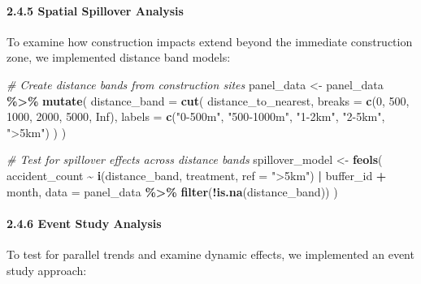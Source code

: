 \documentclass[
]{article}
\newenvironment{Shaded}{\begin{snugshade}}{\end{snugshade}}
\newcommand{\AttributeTok}[1]{\textcolor[rgb]{0.13,0.29,0.53}{#1}}
\newcommand{\CommentTok}[1]{\textcolor[rgb]{0.56,0.35,0.01}{\textit{#1}}}
\newcommand{\ConstantTok}[1]{\textcolor[rgb]{0.56,0.35,0.01}{#1}}
\newcommand{\DecValTok}[1]{\textcolor[rgb]{0.00,0.00,0.81}{#1}}
\newcommand{\FunctionTok}[1]{\textcolor[rgb]{0.13,0.29,0.53}{\textbf{#1}}}
\newcommand{\NormalTok}[1]{#1}
\newcommand{\OtherTok}[1]{\textcolor[rgb]{0.56,0.35,0.01}{#1}}
\newcommand{\SpecialCharTok}[1]{\textcolor[rgb]{0.81,0.36,0.00}{\textbf{#1}}}
\newcommand{\StringTok}[1]{\textcolor[rgb]{0.31,0.60,0.02}{#1}}
\begin{document}
\paragraph{2.4.5 Spatial Spillover
Analysis}\label{spatial-spillover-analysis}

To examine how construction impacts extend beyond the immediate
construction zone, we implemented distance band models:

\begin{Shaded}
\begin{Highlighting}[]
\CommentTok{\# Create distance bands from construction sites}
\NormalTok{panel\_data }\OtherTok{\textless{}{-}}\NormalTok{ panel\_data }\SpecialCharTok{\%\textgreater{}\%}
  \FunctionTok{mutate}\NormalTok{(}
    \AttributeTok{distance\_band =} \FunctionTok{cut}\NormalTok{(}
\NormalTok{      distance\_to\_nearest,}
      \AttributeTok{breaks =} \FunctionTok{c}\NormalTok{(}\DecValTok{0}\NormalTok{, }\DecValTok{500}\NormalTok{, }\DecValTok{1000}\NormalTok{, }\DecValTok{2000}\NormalTok{, }\DecValTok{5000}\NormalTok{, }\ConstantTok{Inf}\NormalTok{),}
      \AttributeTok{labels =} \FunctionTok{c}\NormalTok{(}\StringTok{"0{-}500m"}\NormalTok{, }\StringTok{"500{-}1000m"}\NormalTok{, }\StringTok{"1{-}2km"}\NormalTok{, }\StringTok{"2{-}5km"}\NormalTok{, }\StringTok{"\textgreater{}5km"}\NormalTok{)}
\NormalTok{    )}
\NormalTok{  )}

\CommentTok{\# Test for spillover effects across distance bands}
\NormalTok{spillover\_model }\OtherTok{\textless{}{-}} \FunctionTok{feols}\NormalTok{(}
\NormalTok{  accident\_count }\SpecialCharTok{\textasciitilde{}} \FunctionTok{i}\NormalTok{(distance\_band, treatment, }\AttributeTok{ref =} \StringTok{"\textgreater{}5km"}\NormalTok{) }\SpecialCharTok{|}\NormalTok{ buffer\_id }\SpecialCharTok{+}\NormalTok{ month,}
  \AttributeTok{data =}\NormalTok{ panel\_data }\SpecialCharTok{\%\textgreater{}\%} \FunctionTok{filter}\NormalTok{(}\SpecialCharTok{!}\FunctionTok{is.na}\NormalTok{(distance\_band))}
\NormalTok{)}
\end{Highlighting}
\end{Shaded}

\paragraph{2.4.6 Event Study Analysis}\label{event-study-analysis}

To test for parallel trends and examine dynamic effects, we implemented
an event study approach:
\end{document}
